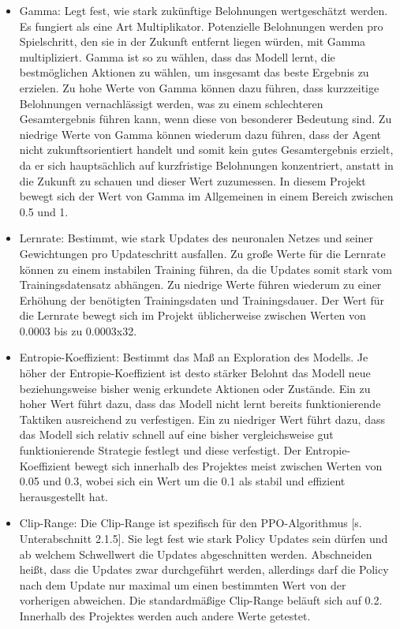 \begin{itemize} 
\item Gamma: Legt fest, wie stark zukünftige Belohnungen wertgeschätzt werden. Es fungiert als eine Art Multiplikator. Potenzielle Belohnungen werden pro Spielschritt, den sie in der Zukunft entfernt liegen würden, mit Gamma multipliziert. Gamma ist so zu wählen, dass das Modell lernt, die bestmöglichen Aktionen zu wählen, um insgesamt das beste Ergebnis zu erzielen. Zu hohe Werte von Gamma können dazu führen, dass kurzzeitige Belohnungen vernachlässigt werden, was zu einem schlechteren Gesamtergebnis führen kann, wenn diese von besonderer Bedeutung sind. Zu niedrige Werte von Gamma können wiederum dazu führen, dass der Agent nicht zukunftsorientiert handelt und somit kein gutes Gesamtergebnis erzielt, da er sich hauptsächlich auf kurzfristige Belohnungen konzentriert, anstatt in die Zukunft zu schauen und dieser Wert zuzumessen. In diesem Projekt bewegt sich der Wert von Gamma im Allgemeinen in einem Bereich zwischen 0.5 und 1.

\item Lernrate: Bestimmt, wie stark Updates des neuronalen Netzes und seiner Gewichtungen pro Updateschritt ausfallen. Zu große Werte für die Lernrate können zu einem instabilen Training führen, da die Updates somit stark vom Trainingsdatensatz abhängen. Zu niedrige Werte führen wiederum zu einer Erhöhung der benötigten Trainingsdaten und Trainingsdauer. Der Wert für die Lernrate bewegt sich im Projekt üblicherweise zwischen Werten von 0.0003 bis zu 0.0003x32.

\item Entropie-Koeffizient: Bestimmt das Maß an Exploration des Modells. Je höher der Entropie-Koeffizient ist desto stärker Belohnt das Modell neue beziehungsweise bisher wenig erkundete Aktionen oder Zustände. Ein zu hoher Wert führt dazu, dass das Modell nicht lernt bereits funktionierende Taktiken ausreichend zu verfestigen. Ein zu niedriger Wert führt dazu, dass das Modell sich relativ schnell auf eine bisher vergleichsweise gut funktionierende Strategie festlegt und diese verfestigt. Der Entropie-Koeffizient bewegt sich innerhalb des Projektes meist zwischen Werten von 0.05 und 0.3, wobei sich ein Wert um die 0.1 als stabil und effizient herausgestellt hat.

\item Clip-Range: Die Clip-Range ist spezifisch für den PPO-Algorithmus [s. Unterabschnitt 2.1.5]. Sie legt fest wie stark Policy Updates sein dürfen und ab welchem Schwellwert die Updates abgeschnitten werden. Abschneiden heißt, dass die Updates zwar durchgeführt werden, allerdings darf die Policy nach dem Update nur maximal um einen bestimmten Wert von der vorherigen abweichen. Die standardmäßige Clip-Range beläuft sich auf 0.2. Innerhalb des Projektes werden auch andere Werte getestet.


\end{itemize}
